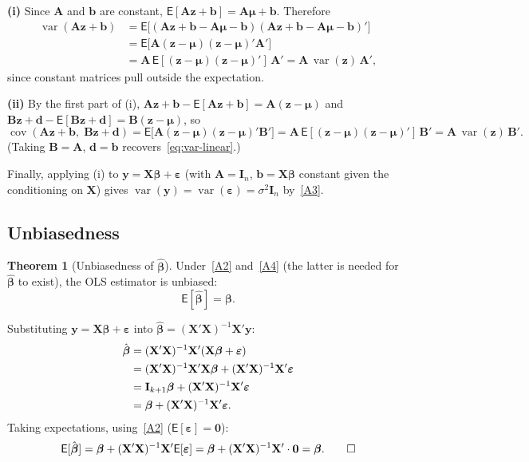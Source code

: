 \documentclass[12pt,a4paper]{article}
\makeatletter
\theoremstyle{definition}
\newtheorem{theorem}{Theorem}[section]
\renewenvironment{proof}[1][\proofname]{\par
  \pushQED{\qed}%
  \normalfont \topsep6\p@\@plus6\p@\relax
  \trivlist
  \item[\hskip\labelsep\bfseries #1\@addpunct{.}]\ignorespaces
}{%
  \popQED\endtrivlist\@endpefalse
}
\newcommand\expc{\mathsf{E}}
\DeclareMathOperator\var{var}
\DeclareMathOperator\cov{cov}
\newcommand{\bX}{\mathbf{X}}
\newcommand{\by}{\mathbf{y}}
\def\bb{\boldsymbol{\beta}}
\newcommand{\be}{\boldsymbol{\varepsilon}}
\newcommand{\bI}{\mathbf{I}}
\newcommand{\bzero}{\mathbf{0}}
\newcommand{\bz}{\mathbf{z}}
\newcommand{\bA}{\mathbf{A}}
\makeatother
\begin{document}
\begin{proof}
\textbf{(i)} Since $\bA$ and $\mathbf{b}$ are constant, $\expc[\bA\bz + \mathbf{b}] = \bA\boldsymbol\mu + \mathbf{b}$. Therefore
\begin{align*}
\var(\bA\bz + \mathbf{b}) &= \expc\bigl[(\bA\bz + \mathbf{b} - \bA\boldsymbol\mu - \mathbf{b})(\bA\bz + \mathbf{b} - \bA\boldsymbol\mu - \mathbf{b})'\bigr]\\
&= \expc\bigl[\bA(\bz - \boldsymbol\mu)(\bz - \boldsymbol\mu)'\bA'\bigr]\\
&= \bA\,\expc[(\bz - \boldsymbol\mu)(\bz - \boldsymbol\mu)']\,\bA' = \bA\,\var(\bz)\,\bA',
\end{align*}
since constant matrices pull outside the expectation.

\textbf{(ii)} By the first part of (i), $\bA\bz + \mathbf{b} - \expc[\bA\bz + \mathbf{b}] = \bA(\bz - \boldsymbol\mu)$ and $\mathbf{B}\bz + \mathbf{d} - \expc[\mathbf{B}\bz + \mathbf{d}] = \mathbf{B}(\bz - \boldsymbol\mu)$, so
\[
\cov(\bA\bz + \mathbf{b},\; \mathbf{B}\bz + \mathbf{d}) = \expc\bigl[\bA(\bz - \boldsymbol\mu)(\bz - \boldsymbol\mu)'\mathbf{B}'\bigr] = \bA\,\expc[(\bz - \boldsymbol\mu)(\bz - \boldsymbol\mu)']\,\mathbf{B}' = \bA\,\var(\bz)\,\mathbf{B}'.
\]
(Taking $\mathbf{B} = \bA$, $\mathbf{d} = \mathbf{b}$ recovers~\eqref{eq:var-linear}.)

Finally, applying (i) to $\by = \bX\bb + \be$ (with $\bA = \bI_n$, $\mathbf{b} = \bX\bb$ constant given the conditioning on $\bX$) gives $\var(\by) = \var(\be) = \sigma^2\bI_n$ by~\ref{A3}.
\end{proof}

\subsection{Unbiasedness}

\begin{theorem}[Unbiasedness of $\hat{\bb}$]\label{thm:unbiased}
Under~\ref{A2} and~\ref{A4} (the latter is needed for $\hat{\bb}$ to exist), the OLS estimator is unbiased:
\begin{equation}
\boxed{\expc[\hat{\bb}] = \bb.}
\end{equation}
\end{theorem}

\begin{proof}
Substituting $\by = \bX\bb + \be$ into $\hat{\bb} = (\bX'\bX)^{-1}\bX'\by$:
\begin{align}
\hat{\bb} &= (\bX'\bX)^{-1}\bX'(\bX\bb + \be) \notag\\
&= (\bX'\bX)^{-1}\bX'\bX\bb + (\bX'\bX)^{-1}\bX'\be \notag\\
&= \bI_{k+1}\bb + (\bX'\bX)^{-1}\bX'\be \notag\\
&= \bb + (\bX'\bX)^{-1}\bX'\be. \label{eq:beta-decomp}
\end{align}
Taking expectations, using~\ref{A2} ($\expc[\be] = \bzero$):
\[
\expc[\hat{\bb}] = \bb + (\bX'\bX)^{-1}\bX'\expc[\be] = \bb + (\bX'\bX)^{-1}\bX' \cdot \bzero = \bb. \qedhere
\]
\end{proof}
\end{document}
